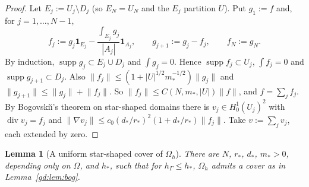 \documentclass[11pt,reqno]{amsart}
\theoremstyle{plain}
\newtheorem{lemma}[theorem]{Lemma}
\theoremstyle{definition}
\newcommand{\hG}{h_\Gamma}
\newcommand{\Oh}{\Omega_h}
\newcommand{\norm}[1]{\lVert #1\rVert}
\renewcommand{\div}{\operatorname{div}}
\begin{document}
\begin{proof}
Let $E_j:=U_j\setminus D_j$ (so $E_N=U_N$ and the $E_j$ partition $U$). Put $g_1:=f$ and, for $j=1,\dots,N-1$,
\[
f_j:=g_j\mathbf 1_{E_j}-\frac{\int_{E_j}g_j}{|A_j|}\mathbf 1_{A_j},\qquad g_{j+1}:=g_j-f_j,\qquad f_N:=g_N .
\]
By induction, $\operatorname{supp}g_j\subset E_j\cup D_j$ and $\int g_j=0$. Hence $\operatorname{supp}f_j\subset U_j$, $\int f_j=0$ and $\operatorname{supp}g_{j+1}\subset D_j$. Also $\norm{f_j}\le(1+|U|^{1/2}m_\ast^{-1/2})\norm{g_j}$ and $\norm{g_{j+1}}\le\norm{g_j}+\norm{f_j}$. So $\norm{f_j}\le C(N,m_\ast,|U|)\norm f$, and $f=\sum_jf_j$. By Bogovski\u{\i}'s theorem on star-shaped domains \cite[Thm.~III.3.1]{Galdi} there is $v_j\in H^1_0(U_j)^2$ with $\div v_j=f_j$ and $\norm{\nabla v_j}\le c_0(d_\ast/r_\ast)^2(1+d_\ast/r_\ast)\norm{f_j}$. Take $v:=\sum_jv_j$, each extended by zero.
\end{proof}

\begin{lemma}[A uniform star-shaped cover of $\Oh$]\label{gd:lem:cover}
There are $N$, $r_\ast$, $d_\ast$, $m_\ast>0$, depending only on $\Omega$, and $h_\ast$, such that for $\hG\le h_\ast$, $\Oh$ admits a cover as in Lemma~\ref{gd:lem:bog}.
\end{lemma}
\end{document}
